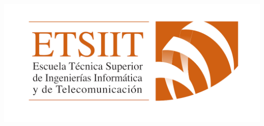\documentclass[12pt, spanish]{article}
\makeatletter
\let\thedate\@date
\makeatother
\begin{document}
\begin{titlepage}
	 \includegraphics[scale = 0.20]{logo_etsiit.png}\\[0.3 cm]
    {\large \thedate}\\[0.75cm]
    \doclicenseThis
\end{titlepage}



\pagestyle{fancy}




\tableofcontents
\pagebreak





\end{document}
